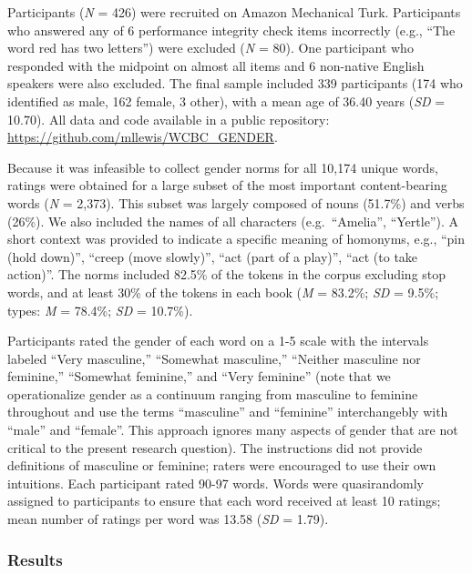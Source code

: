 \documentclass[
  english,
  ,man,floatsintext]{apa6}
\begin{document}
Participants (\emph{N} = 426) were recruited on Amazon Mechanical Turk. Participants who answered any of 6 performance integrity check items incorrectly (e.g., \enquote{The word red has two letters}) were excluded (\emph{N} = 80). One participant who responded with the midpoint on almost all items and 6 non-native English speakers were also excluded. The final sample included 339 participants (174 who identified as male, 162 female, 3 other), with a mean age of 36.40 years (\emph{SD} = 10.70). All data and code available in a public repository: \url{https://github.com/mllewis/WCBC_GENDER}.

Because it was infeasible to collect gender norms for all 10,174 unique words, ratings were obtained for a large subset of the most important content-bearing words (\emph{N} = 2,373). This subset was largely composed of nouns (51.7\%) and verbs (26\%). We also included the names of all characters (e.g.~\enquote{Amelia}, \enquote{Yertle}). A short context was provided to indicate a specific meaning of homonyms, e.g., \enquote{pin (hold down)}, \enquote{creep (move slowly)}, \enquote{act (part of a play)}, \enquote{act (to take action)}. The norms included 82.5\% of the tokens in the corpus excluding stop words, and at least 30\% of the tokens in each book (\emph{M} = 83.2\%; \emph{SD} = 9.5\%; types: \emph{M} = 78.4\%; \emph{SD} = 10.7\%).

Participants rated the gender of each word on a 1-5 scale with the intervals labeled \enquote{Very masculine,} \enquote{Somewhat masculine,} \enquote{Neither masculine nor feminine,} \enquote{Somewhat feminine,} and \enquote{Very feminine} (note that we operationalize gender as a continuum ranging from masculine to feminine throughout and use the terms \enquote{masculine} and \enquote{feminine} interchangebly with \enquote{male} and \enquote{female}. This approach ignores many aspects of gender that are not critical to the present research question). The instructions did not provide definitions of masculine or feminine; raters were encouraged to use their own intuitions. Each participant rated 90-97 words. Words were quasirandomly assigned to participants to ensure that each word received at least 10 ratings; mean number of ratings per word was 13.58 (\emph{SD} = 1.79).

\hypertarget{results}{%
\subsubsection{Results}\label{results}}
\end{document}
